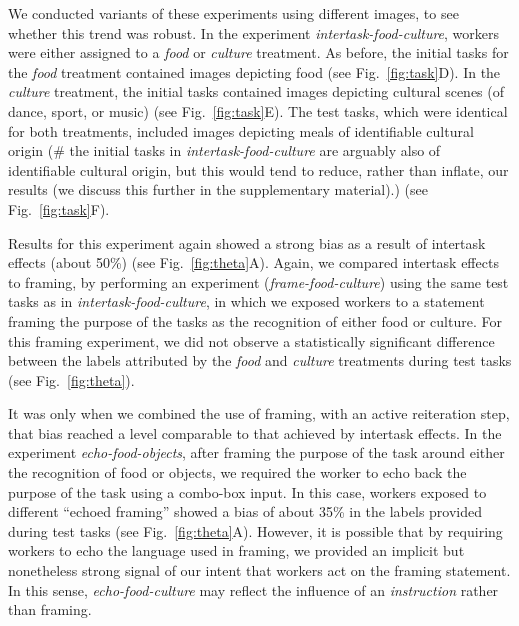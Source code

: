 \documentclass[12pt]{article}
\begin{document}
We conducted variants of these experiments using different images, to see 
whether this trend was robust.  In the experiment 
\textit{intertask-food-culture},
workers were either assigned to a \textit{food} or \textit{culture} treatment.
As before, the initial tasks for the \textit{food} treatment contained images 
depicting food (see Fig.~\ref{fig:task}D). 
In the \textit{culture} treatment, 
the initial tasks contained images depicting cultural scenes 
(of dance, sport, or music) (see Fig.~\ref{fig:task}E).  The test tasks, which were identical for both
treatments, included images depicting meals of identifiable cultural 
origin (\# the initial tasks in 
\textit{intertask-food-culture} are arguably also of identifiable cultural 
origin, but this would tend to reduce, rather than inflate, our results
(we discuss this further in the supplementary material).)
(see Fig.~\ref{fig:task}F).  

Results for this experiment again showed a 
strong bias as a result of intertask effects (about 50\%) 
(see Fig.~\ref{fig:theta}A).  Again, we compared intertask effects to 
framing, by performing an experiment (\textit{frame-food-culture}) using 
the same test tasks as in \textit{intertask-food-culture}, in which we exposed
workers to a statement framing the purpose of the tasks as the recognition 
of either food or culture.  
For this framing experiment, we did not observe a statistically significant 
difference between the labels attributed by the \textit{food} and 
\textit{culture} treatments during test tasks (see Fig.~\ref{fig:theta}).

It was only when we combined the use of framing, with an active 
reiteration step, that bias reached a level comparable to that achieved 
by intertask effects.  In the experiment \textit{echo-food-objects},
after framing the purpose of the task around either the recognition of food
or objects, we required the worker to echo back the purpose of the task
using a combo-box input.  In this case, workers exposed to different 
``echoed framing'' showed a bias of about 35\% in the labels provided during 
test tasks
(see Fig.~\ref{fig:theta}A). However, it is possible that by requiring 
workers to echo the language used in framing, we provided an implicit 
but nonetheless strong signal of our intent that workers act on the 
framing statement.  In this sense, \textit{echo-food-culture} may reflect the 
influence of an \textit{instruction} rather than framing.
\end{document}
